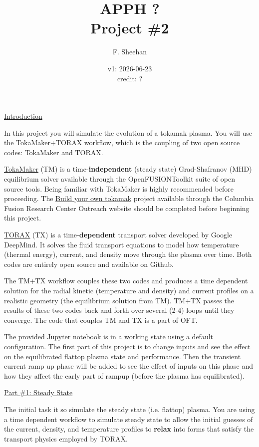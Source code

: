 \documentclass[letterpaper,12pt]{article}
\title{\vspace{-0.5 in} APPH ? \\ Project \#2}
\date{v1: 2026-06-23 \\ credit: ?}
\author{F. Sheehan}
\let\oldhref\href
\renewcommand{\href}[2]{\oldhref{#1}{\uline{#2}}}
\begin{document}
\maketitle


\underline{Introduction}

In this project you will simulate the evolution of a tokamak plasma. You will use the TokaMaker+TORAX workflow, which is the coupling of two open source codes: TokaMaker and TORAX.

\href{https://github.com/OpenFUSIONToolkit/OpenFUSIONToolkit}{TokaMaker} (TM) is a time-\textbf{independent} (steady state) Grad-Shafranov (MHD) equilibrium solver available through the OpenFUSIONToolkit suite of open source tools. Being familiar with TokaMaker is highly recommended before proceeding. The \href{https://fusion.columbia.edu/build-your-own-tokamak}{Build your own tokamak} project available through the Columbia Fusion Research Center Outreach website should be completed before beginning this project.

\href{https://github.com/google-deepmind/torax}{TORAX} (TX) is a time-\textbf{dependent} transport solver developed by Google DeepMind. It solves the fluid transport equations to model how temperature (thermal energy), current, and density move through the plasma over time. Both codes are entirely open source and available on Github. 

The TM+TX workflow couples these two codes and produces a time dependent solution for the radial kinetic (temperature and density) and current profiles on a realistic geometry (the equilibrium solution from TM). TM+TX passes the results of these two codes back and forth over several (2-4) loops until they converge. The code that couples TM and TX is a part of OFT.


The provided Jupyter notebook is in a working state using a default configuration. The first part of this project is to change inputs and see the effect on the equilibrated flattop plasma state and performance. Then the transient current ramp up phase will be added to see the effect of inputs on this phase and how they affect the early part of rampup (before the plasma has equilibrated).

\newpage
\clearpage

\underline{Part \#1: Steady State}

The initial task it so simulate the steady state (i.e. flattop) plasma. You are using a time dependent workflow to simulate steady state to allow the initial guesses of the current, density, and temperature profiles to \textbf{relax} into forms that satisfy the transport physics employed by TORAX. 
\end{document}
